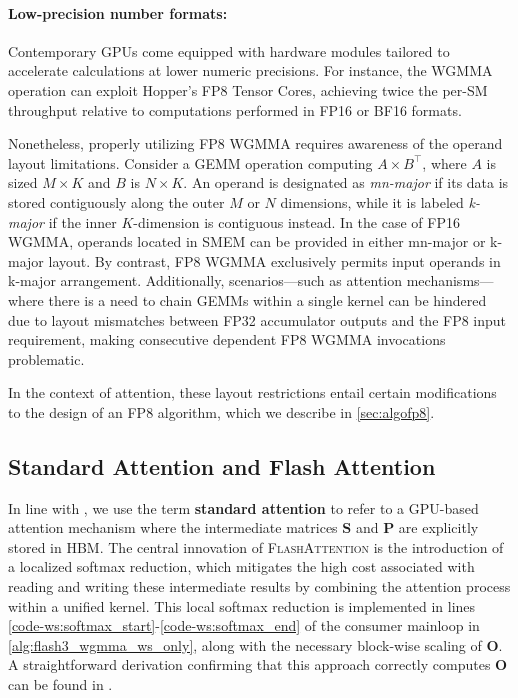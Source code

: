 \begin{enumerate}
\paragraph{Low-precision number formats:}
\label{sec:low-precision-gpu}
Contemporary GPUs come equipped with hardware modules tailored to accelerate calculations at lower numeric precisions. For instance, the WGMMA operation can exploit Hopper's FP8 Tensor Cores, achieving twice the per-SM throughput relative to computations performed in FP16 or BF16 formats.

Nonetheless, properly utilizing FP8 WGMMA requires awareness of the operand layout limitations. Consider a GEMM operation computing $A \times B^{\top}$, where $A$ is sized $M \times K$ and $B$ is $N \times K$. An operand is designated as \emph{mn-major} if its data is stored contiguously along the outer $M$ or $N$ dimensions, while it is labeled \emph{k-major} if the inner $K$-dimension is contiguous instead. In the case of FP16 WGMMA, operands located in SMEM can be provided in either mn-major or k-major layout. By contrast, FP8 WGMMA exclusively permits input operands in k-major arrangement. Additionally, scenarios—such as attention mechanisms—where there is a need to chain GEMMs within a single kernel can be hindered due to layout mismatches between FP32 accumulator outputs and the FP8 input requirement, making consecutive dependent FP8 WGMMA invocations problematic.

In the context of attention, these layout restrictions entail certain modifications to the design of an FP8 algorithm, which we describe in \cref{sec:algofp8}.

\subsection{Standard Attention and Flash Attention} In line with \citet{dao2022flashattention}, we use the term \textbf{standard attention} to refer to a GPU-based attention mechanism where the intermediate matrices $\mathbf{S}$ and $\mathbf{P}$ are explicitly stored in HBM. The central innovation of \textsc{FlashAttention} is the introduction of a localized softmax reduction, which mitigates the high cost associated with reading and writing these intermediate results by combining the attention process within a unified kernel. This local softmax reduction is implemented in lines \ref{code-ws:softmax_start}-\ref{code-ws:softmax_end} of the consumer mainloop in \cref{alg:flash3_wgmma_ws_only}, along with the necessary block-wise scaling of $\mathbf{O}$. A straightforward derivation confirming that this approach correctly computes $\mathbf{O}$ can be found in \cite[\S 2.3.1]{dao2023flashattention2}.


\end{enumerate}
